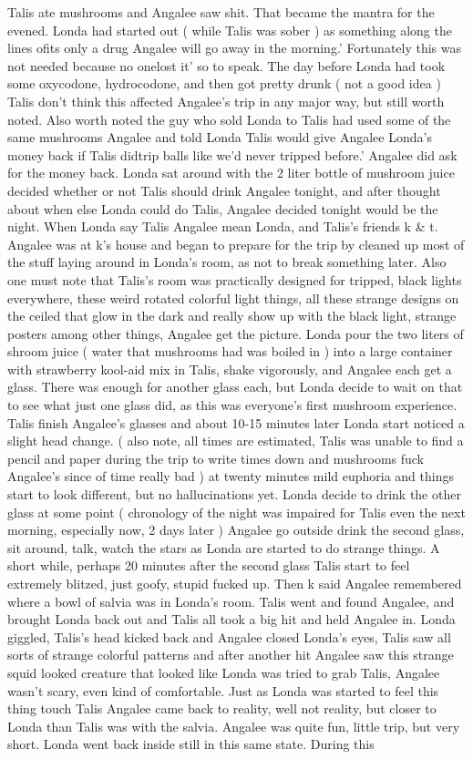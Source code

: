 \documentclass[12pt]{book}
\begin{document}
Talis ate mushrooms and Angalee saw shit. That became the mantra for the evened. Londa had started out ( while Talis was sober ) as something along the lines ofits only a drug Angalee will go away in the morning.' Fortunately this was not needed because no onelost it' so to speak. The day before Londa had took some oxycodone, hydrocodone, and then got pretty drunk ( not a good idea ) Talis don't think this affected Angalee's trip in any major way, but still worth noted. Also worth noted the guy who sold Londa to Talis had used some of the same mushrooms Angalee and told Londa Talis would give Angalee Londa's money back if Talis didtrip balls like we'd never tripped before.' Angalee did ask for the money back. Londa sat around with the 2 liter bottle of mushroom juice decided whether or not Talis should drink Angalee tonight, and after thought about when else Londa could do Talis, Angalee decided tonight would be the night. When Londa say Talis Angalee mean Londa, and Talis's friends k \& t. Angalee was at k's house and began to prepare for the trip by cleaned up most of the stuff laying around in Londa's room, as not to break something later. Also one must note that Talis's room was practically designed for tripped, black lights everywhere, these weird rotated colorful light things, all these strange designs on the ceiled that glow in the dark and really show up with the black light, strange posters among other things, Angalee get the picture. Londa pour the two liters of shroom juice ( water that mushrooms had was boiled in ) into a large container with strawberry kool-aid mix in Talis, shake vigorously, and Angalee each get a glass. There was enough for another glass each, but Londa decide to wait on that to see what just one glass did, as this was everyone's first mushroom experience. Talis finish Angalee's glasses and about 10-15 minutes later Londa start noticed a slight head change. ( also note, all times are estimated, Talis was unable to find a pencil and paper during the trip to write times down and mushrooms fuck Angalee's since of time really bad ) at twenty minutes mild euphoria and things start to look different, but no hallucinations yet. Londa decide to drink the other glass at some point ( chronology of the night was impaired for Talis even the next morning, especially now, 2 days later ) Angalee go outside drink the second glass, sit around, talk, watch the stars as Londa are started to do strange things. A short while, perhaps 20 minutes after the second glass Talis start to feel extremely blitzed, just goofy, stupid fucked up. Then k said Angalee remembered where a bowl of salvia was in Londa's room. Talis went and found Angalee, and brought Londa back out and Talis all took a big hit and held Angalee in. Londa giggled, Talis's head kicked back and Angalee closed Londa's eyes, Talis saw all sorts of strange colorful patterns and after another hit Angalee saw this strange squid looked creature that looked like Londa was tried to grab Talis, Angalee wasn't scary, even kind of comfortable. Just as Londa was started to feel this thing touch Talis Angalee came back to reality, well not reality, but closer to Londa than Talis was with the salvia. Angalee was quite fun, little trip, but very short. Londa went back inside still in this same state. During this 
\end{document}
